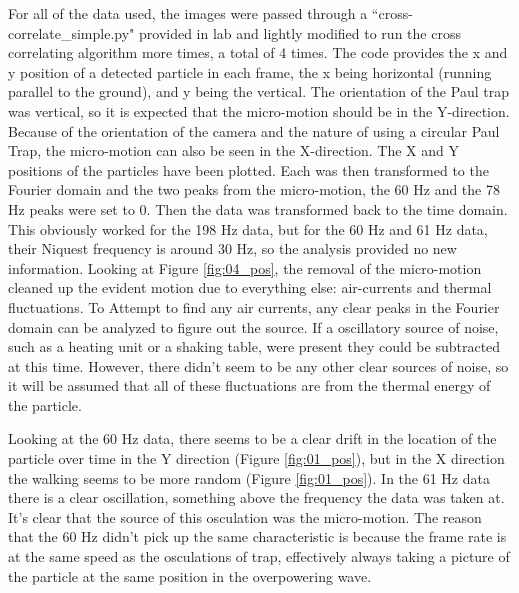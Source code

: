 \documentclass[12pt]{article}
\begin{document}
For all of the data used, the images were passed through a ``cross-correlate\_simple.py" provided in lab and lightly modified to run the cross correlating algorithm more times, a total of 4 times. The code provides the x and y position of a detected particle in each frame, the x being horizontal (running parallel to the ground), and y being the vertical. The orientation of the Paul trap was vertical, so it is expected that the micro-motion should be in the Y-direction. Because of the orientation of the camera and the nature of using a circular Paul Trap, the micro-motion can also be seen in the X-direction. The X and Y positions of the particles have been plotted. Each was then transformed to the Fourier domain and the two peaks from the micro-motion, the 60 Hz and the 78 Hz peaks were set to 0. Then the data was transformed back to the time domain. This obviously worked for the 198 Hz data, but for the 60 Hz and 61 Hz data, their Niquest frequency is around 30 Hz, so the analysis provided no new information. Looking at Figure \ref{fig:04_pos}, the removal of the micro-motion cleaned up the evident motion due to everything else: air-currents and thermal fluctuations. To Attempt to find any air currents, any clear peaks in the Fourier domain can be analyzed to figure out the source. If a oscillatory source of noise, such as a heating unit or a shaking table, were present they could be subtracted at this time. However, there didn't seem to be any other clear sources of noise, so it will be assumed that all of these fluctuations are from the thermal energy of the particle. 

Looking at the 60 Hz data, there seems to be a clear drift in the location of the particle over time in the Y direction (Figure \ref{fig:01_pos}), but in the X direction the walking seems to be more random (Figure \ref{fig:01_pos}). In the 61 Hz data there is a clear oscillation, something above the frequency the data was taken at. It's clear that the source of this osculation was the micro-motion. The reason that the 60 Hz didn't pick up the same characteristic is because the frame rate is at the same speed as the osculations of trap, effectively always taking a picture of the particle at the same position in the overpowering wave. 
\end{document}
